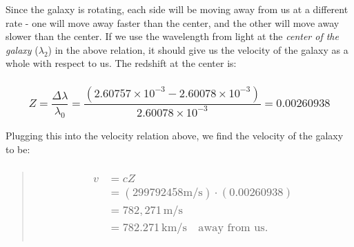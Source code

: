 \documentclass[
]{article}
\begin{document}
Since the galaxy is rotating, each side will be moving away from us at a
different rate - one will move away faster than the center, and the
other will move away slower than the center. If we use the wavelength
from light at the \emph{center of the galaxy} ({\(\lambda_{2}\)}) in the
above relation, it should give us the velocity of the galaxy as a whole
with respect to us. The redshift at the center is:

\hypertarget{z-fracdeltalambdalambda_0-frac2.60757-times-10--3---2.60078-times-10--32.60078-times-10--3-0.00260938}{%
\subsubsection{\texorpdfstring{{\[Z = \frac{\Delta\lambda}{\lambda_{0}} = \frac{(2.60757 \times 10^{- 3} - 2.60078 \times 10^{- 3})}{2.60078 \times 10^{- 3}} = 0.00260938\]}}{Z = \textbackslash frac\{\textbackslash Delta\textbackslash lambda\}\{\textbackslash lambda\_\{0\}\} = \textbackslash frac\{(2.60757 \textbackslash times 10\^{}\{- 3\} - 2.60078 \textbackslash times 10\^{}\{- 3\})\}\{2.60078 \textbackslash times 10\^{}\{- 3\}\} = 0.00260938}}\label{z-fracdeltalambdalambda_0-frac2.60757-times-10--3---2.60078-times-10--32.60078-times-10--3-0.00260938}}

Plugging this into the velocity relation above, we find the velocity of
the galaxy to be:

\begin{quote}
\hypertarget{beginmatrix-v-cz-299792458textms-cdot-0.00260938-782271textms-782.271textkmsquadtextaway-from-us.quad-endmatrix}{%
\subsubsection{\texorpdfstring{{\[\begin{matrix}
v & {= cZ} \\
 & {= (299792458\text{m/s}) \cdot (0.00260938)} \\
 & {= 782,271\,\text{m/s}} \\
 & {= 782.271\,\text{km/s}\quad\text{away\ from\ us.}\quad} \\
\end{matrix}\]}}{\textbackslash begin\{matrix\}
v \& \{= cZ\} \textbackslash\textbackslash{}
 \& \{= (299792458\textbackslash text\{m/s\}) \textbackslash cdot (0.00260938)\} \textbackslash\textbackslash{}
 \& \{= 782,271\textbackslash,\textbackslash text\{m/s\}\} \textbackslash\textbackslash{}
 \& \{= 782.271\textbackslash,\textbackslash text\{km/s\}\textbackslash quad\textbackslash text\{away\textbackslash{} from\textbackslash{} us.\}\textbackslash quad\} \textbackslash\textbackslash{}
\textbackslash end\{matrix\}}}\label{beginmatrix-v-cz-299792458textms-cdot-0.00260938-782271textms-782.271textkmsquadtextaway-from-us.quad-endmatrix}}
\end{quote}
\end{document}
